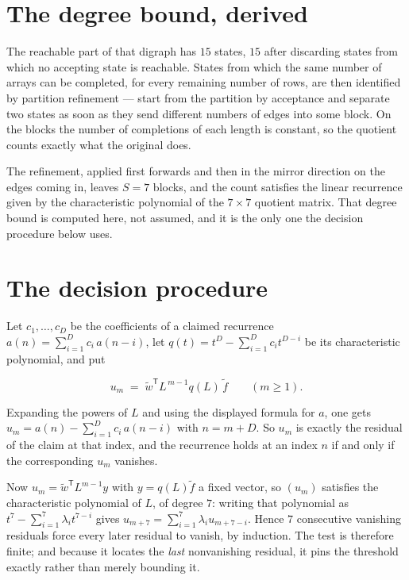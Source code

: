 \documentclass[11pt]{article}
\theoremstyle{definition}
\begin{document}
\section{The degree bound, derived}

The reachable part of that digraph has $15$ states, $15$ after discarding states from which no accepting state is reachable. States from which the same number of arrays can be completed, for every remaining number of rows, are then identified by partition refinement --- start from the partition by acceptance and separate two states as soon as they send different numbers of edges into some block. On the blocks the number of completions of each length is constant, so the quotient counts exactly what the original does.

The refinement, applied first forwards and then in the mirror direction on the edges coming in, leaves $S = 7$ blocks, and the count satisfies the linear recurrence given by the characteristic polynomial of the $7 \times 7$ quotient matrix. That degree bound is computed here, not assumed, and it is the only one the decision procedure below uses.

\section{The decision procedure}

Let $c_1,\dots,c_D$ be the coefficients of a claimed recurrence $a(n) = \sum_{i=1}^{D} c_i\,a(n-i)$, let $q(t) = t^{D} - \sum_{i=1}^{D} c_i t^{D-i}$ be its characteristic polynomial, and put

\[u_m \;=\; \tilde w^{\mathsf T} L^{\,m-1} q(L)\,\tilde f \qquad (m \ge 1).\]

Expanding the powers of $L$ and using the displayed formula for $a$, one gets $u_m = a(n) - \sum_{i=1}^{D} c_i\,a(n-i)$ with $n = m + D$. So $u_m$ is exactly the residual of the claim at that index, and the recurrence holds at an index $n$ if and only if the corresponding $u_m$ vanishes.

Now $u_m = \tilde w^{\mathsf T} L^{m-1} y$ with $y = q(L)\tilde f$ a fixed vector, so $(u_m)$ satisfies the characteristic polynomial of $L$, of degree $7$: writing that polynomial as $t^{7} - \sum_{i=1}^{7} \lambda_i t^{7-i}$ gives $u_{m+7} = \sum_{i=1}^{7} \lambda_i u_{m+7-i}$. Hence $7$ consecutive vanishing residuals force every later residual to vanish, by induction. The test is therefore finite; and because it locates the {\itshape last} nonvanishing residual, it pins the threshold exactly rather than merely bounding it.
\end{document}

